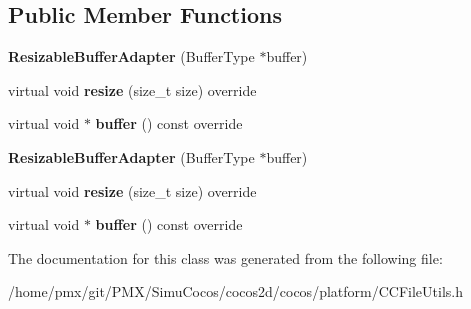 \subsection*{Public Member Functions}
\begin{DoxyCompactItemize}
\item 
\mbox{\label{classResizableBufferAdapter_3_01std_1_1vector_3_01T_00_01Allocator_01_4_01_4_a559d69515dedda9b5f29ed0685588262}} 
{\bfseries Resizable\+Buffer\+Adapter} (Buffer\+Type $\ast$buffer)
\item 
\mbox{\label{classResizableBufferAdapter_3_01std_1_1vector_3_01T_00_01Allocator_01_4_01_4_aac9587417c3216fa5b6ca18a4f717ce6}} 
virtual void {\bfseries resize} (size\+\_\+t size) override
\item 
\mbox{\label{classResizableBufferAdapter_3_01std_1_1vector_3_01T_00_01Allocator_01_4_01_4_a0921bb11bdef8a7f6469f7b459e27b36}} 
virtual void $\ast$ {\bfseries buffer} () const override
\item 
\mbox{\label{classResizableBufferAdapter_3_01std_1_1vector_3_01T_00_01Allocator_01_4_01_4_a559d69515dedda9b5f29ed0685588262}} 
{\bfseries Resizable\+Buffer\+Adapter} (Buffer\+Type $\ast$buffer)
\item 
\mbox{\label{classResizableBufferAdapter_3_01std_1_1vector_3_01T_00_01Allocator_01_4_01_4_aac9587417c3216fa5b6ca18a4f717ce6}} 
virtual void {\bfseries resize} (size\+\_\+t size) override
\item 
\mbox{\label{classResizableBufferAdapter_3_01std_1_1vector_3_01T_00_01Allocator_01_4_01_4_a0921bb11bdef8a7f6469f7b459e27b36}} 
virtual void $\ast$ {\bfseries buffer} () const override
\end{DoxyCompactItemize}


The documentation for this class was generated from the following file\+:\begin{DoxyCompactItemize}
\item 
/home/pmx/git/\+P\+M\+X/\+Simu\+Cocos/cocos2d/cocos/platform/C\+C\+File\+Utils.\+h\end{DoxyCompactItemize}
